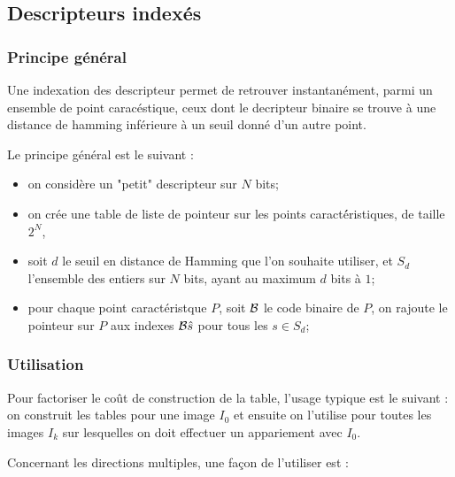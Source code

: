 
\subsection{Descripteurs index\'es}
\label{DescIndex}

\subsubsection{Principe g\'en\'eral}

Une indexation des descripteur permet de retrouver instantan\'ement, parmi
un ensemble de point carac\'estique, ceux dont le decripteur binaire se trouve
\`a une distance de hamming inf\'erieure \`a un seuil donn\'e d'un autre point.

Le principe g\'en\'eral est le suivant :

\begin{itemize}
   \item on consid\`ere un "petit" descripteur sur $N$ bits;
   \item on cr\'ee une table de liste de pointeur sur les points caract\'éristiques,
         de taille $2^N$, 
   \item soit $d$ le seuil en distance de Hamming que l'on souhaite utiliser, et $S_d$
         l'ensemble des entiers sur $N$ bits, ayant au maximum $d$ bits \`a $1$;
   \item pour chaque point caract\'eristque $P$, soit ${\mathcal B}$ le code binaire de $P$,
         on rajoute le pointeur sur $P$ aux indexes ${\mathcal B} \hat s$ pour tous les  $s \in S_d$;
\end{itemize}


\subsubsection{Utilisation}

Pour factoriser le co\^ut de construction de la table, l'usage typique est le suivant :
on construit les tables pour une image $I_0$ et ensuite on l'utilise pour toutes les images $I_k$
sur lesquelles on doit effectuer un appariement avec $I_0$.

Concernant les  directions multiples, une fa\c{c}on de l'utiliser est :

